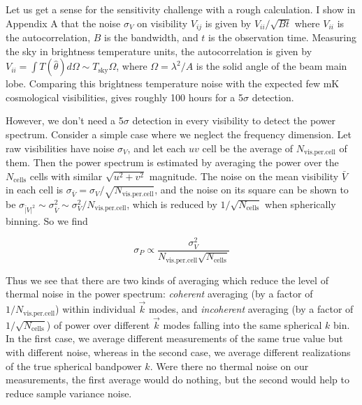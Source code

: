 {Let us get a sense for the sensitivity challenge with a rough calculation. I show in Appendix A that the noise $\sigma_V$ on visibility $V_{ij}$ is given by $V_{ii}/\sqrt{Bt}$ where $V_{ii}$ is the autocorrelation, $B$ is the bandwidth, and $t$ is the observation time. Measuring the sky in brightness temperature units, the autocorrelation is given by $V_{ii}=\int T(\hat\theta)d\Omega\sim T_\text{sky}\Omega$, where $\Omega=\lambda^2/A$ is the solid angle of the beam main lobe. Comparing this brightness temperature noise with the expected few mK cosmological visibilities, gives roughly 100 hours for a 5$\sigma$ detection. 

However, we don't need a 5$\sigma$ detection in every visibility to detect the power spectrum. Consider a simple case where we neglect the frequency dimension. Let raw visibilities have noise $\sigma_V$, and let each $uv$ cell be the average of $N_\text{vis.per.cell}$ of them. Then the power spectrum is estimated by averaging the power over the $N_\text{cells}$ cells with similar $\sqrt{u^2+v^2}$ magnitude. The noise on the mean visibility $\bar{V}$ in each cell is $\sigma_{\bar V}=\sigma_V/\sqrt{N_\text{vis.per.cell}}$, and the noise on its square can be shown to be $\sigma_{\bar |V|^2}\sim\sigma_{\bar V}^2\sim\sigma_V^2/N_\text{vis.per.cell}$, which is reduced by $1/\sqrt{N_\text{cells}}$ when spherically binning. So we find 

\begin{equation}
	\sigma_P\propto\frac{\sigma_V^2}{N_\text{vis.per.cell}\sqrt{N_\text{cells}}}
\end{equation}

Thus we see that there are two kinds of averaging which reduce the level of thermal noise in the power spectrum: \textit{coherent} averaging (by a factor of $1/N_\text{vis.per.cell}$) within individual $\vec{k}$ modes, and \textit{incoherent} averaging (by a factor of $1/\sqrt{N_\text{cells}}$) of power over different $\vec{k}$ modes falling into the same spherical $k$ bin. In the first case, we average different measurements of the same true value but with different noise, whereas in the second case, we average different realizations of the true spherical bandpower $k$. Were there no thermal noise on our measurements, the first average would do nothing, but the second would help to reduce sample variance noise. 

}
